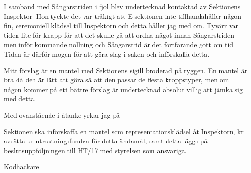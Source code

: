 \documentclass[../_main/handlingar.tex]{subfiles}
\begin{document}

I samband med Sångarstriden i fjol blev undertecknad kontaktad av Sektionens Inspektor. Hon tyckte det var tråkigt att E-sektionen inte tillhandahåller någon fin, ceremoniell klädsel till Inspektorn och detta håller jag med om. Tyvärr var tiden lite för knapp för att det skulle gå att ordna något innan Sångarstriden men inför kommande nollning och Sångarstrid är det fortfarande gott om tid. Tiden är därför mogen för att göra slag i saken och införskaffa detta.

Mitt förslag är en mantel med Sektionens sigill broderad på ryggen. En mantel är bra då den är lätt att göra så att den passar de flesta kroppstyper, men om någon kommer på ett bättre förslag är undertecknad absolut villig att jämka sig med detta.

Med ovanstående i åtanke yrkar jag på
\begin{attsatser}
    \att Sektionen ska införskaffa en mantel som representationsklädsel åt Inspektorn,
     kr avsätts ur utrustningsfonden för detta ändamål, samt
    \att detta läggs på beslutsuppföljningen till HT/17 med styrelsen som ansvariga.
\end{attsatser}

\begin{signatures}{1}
    \mvh
    \signature{Fredrik Peterson}{Kodhackare}
\end{signatures}
\end{document}
